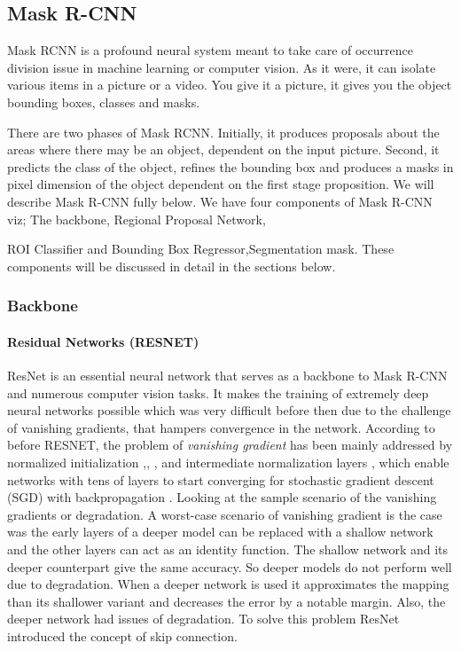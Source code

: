 \subsection{Mask R-CNN}
Mask RCNN is a profound neural system meant to take care of occurrence division issue in machine learning or computer vision. As it were, it can isolate various items in a picture or a video. You give it a picture, it gives you the object bounding boxes, classes and masks. 

There are two phases of Mask RCNN. Initially, it produces proposals about the areas where there may be an object, dependent on the input picture. Second, it predicts the class of the object, refines the bounding box and produces a masks in pixel dimension of the object dependent on the first stage proposition. We will describe Mask R-CNN fully below. We have four components of Mask R-CNN viz; The backbone, Regional Proposal Network,{ROI Classifier and Bounding Box Regressor,Segmentation mask. These components will be discussed in detail in the sections below.
\subsubsection{Backbone}
\paragraph{Residual Networks (RESNET)}

ResNet is an essential neural network that serves as a backbone to Mask R-CNN and numerous computer vision tasks. 
It makes the training of extremely deep neural networks possible which was very difficult before then due to the 
challenge of vanishing gradients, that hampers convergence in the network. According to \protect\cite{M} before RESNET, the problem 
of \textit{vanishing gradient} has been mainly addressed by normalized initialization \protect\cite{N},\protect\cite{GlorotBengio2010}, \protect\cite{P}, \protect\cite{Q} and intermediate 
normalization layers \protect\cite{R}, which enable networks with tens of layers to start converging for stochastic gradient descent 
(SGD) with backpropagation \protect\cite{S}.
Looking at the sample scenario of the vanishing gradients or degradation. A worst-case scenario of vanishing gradient is
 the case was the early layers of a deeper model can be replaced with a shallow network and the other layers can act as an identity function.  The shallow network and its deeper counterpart give the same accuracy. So deeper models do not perform well due to degradation. When a deeper network is used it approximates the mapping than its shallower variant and decreases the error by a notable margin. 
 Also, the deeper network had issues of degradation.
To solve this problem ResNet introduced the concept of skip connection.

}
